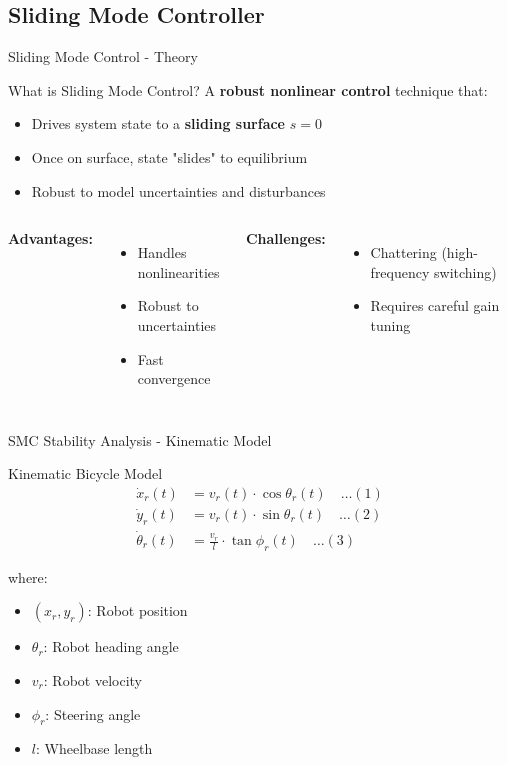 \documentclass[10pt]{beamer}
\begin{document}
\subsection{Sliding Mode Controller}

\begin{frame}{Sliding Mode Control - Theory}
  \begin{block}{What is Sliding Mode Control?}
    A \textbf{robust nonlinear control} technique that:
    \begin{itemize}
      \item Drives system state to a \textbf{sliding surface} $s = 0$
      \item Once on surface, state "slides" to equilibrium
      \item Robust to model uncertainties and disturbances
    \end{itemize}
  \end{block}

  \vspace{0.3cm}

  \begin{columns}[c]
    \textbf{Advantages:}
    \begin{itemize}
      \item Handles nonlinearities
      \item Robust to uncertainties
      \item Fast convergence
    \end{itemize}

    \textbf{Challenges:}
    \begin{itemize}
      \item Chattering (high-frequency switching)
      \item Requires careful gain tuning
    \end{itemize}
  \end{columns}
\end{frame}

\begin{frame}{SMC Stability Analysis - Kinematic Model}
  \begin{block}{Kinematic Bicycle Model}
    \begin{align}
      \dot{x}_r(t) &= v_r(t) \cdot \cos\theta_r(t) \quad \ldots (1) \\
      \dot{y}_r(t) &= v_r(t) \cdot \sin\theta_r(t) \quad \ldots (2) \\
      \dot{\theta}_r(t) &= \frac{v_r}{l} \cdot \tan\phi_r(t) \quad \ldots (3)
    \end{align}
  \end{block}

  where:
  \begin{itemize}
    \item $(x_r, y_r)$: Robot position
    \item $\theta_r$: Robot heading angle
    \item $v_r$: Robot velocity
    \item $\phi_r$: Steering angle
    \item $l$: Wheelbase length
  \end{itemize}
\end{frame}
\end{document}
